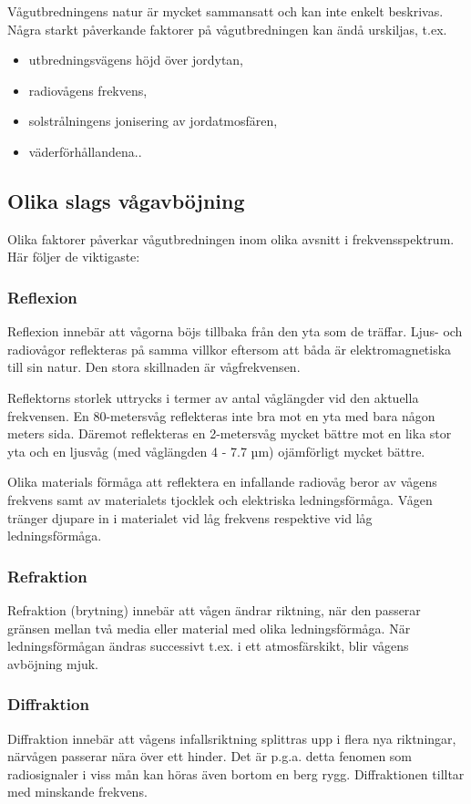 Vågutbredningens natur är mycket sammansatt och kan inte enkelt
beskrivas. Några starkt påverkande faktorer på vågutbredningen kan
ändå urskiljas, t.ex.
\begin{itemize}
\item utbredningsvägens höjd över jordytan,
\item radiovågens frekvens,
\item solstrålningens jonisering av jordatmosfären,
\item väderförhållandena..
\end{itemize}

\subsection{Olika slags vågavböjning}

Olika faktorer påverkar vågutbredningen inom olika avsnitt i
frekvensspektrum. Här följer de viktigaste:

\subsubsection{Reflexion}

Reflexion innebär att vågorna böjs tillbaka från den yta som de
träffar. Ljus- och radiovågor reflekteras på samma villkor eftersom
att båda är elektromagnetiska till sin natur.  Den stora skillnaden är
vågfrekvensen.

Reflektorns storlek uttrycks i termer av antal våglängder vid den
aktuella frekvensen. En 80-metersvåg reflekteras inte bra mot en yta
med bara någon meters sida.  Däremot reflekteras en 2-metersvåg mycket
bättre mot en lika stor yta och en ljusvåg (med våglängden 4 - 7.7 µm)
ojämförligt mycket bättre.

Olika materials förmåga att reflektera en infallande radiovåg beror av
vågens frekvens samt av materialets tjocklek och elektriska
ledningsförmåga. Vågen tränger djupare in i materialet vid låg
frekvens respektive vid låg ledningsförmåga.

\subsubsection{Refraktion}

Refraktion (brytning) innebär att vågen ändrar riktning, när den
passerar gränsen mellan två media eller material med olika
ledningsförmåga. När ledningsförmågan ändras successivt t.ex. i ett
atmosfärskikt, blir vågens avböjning mjuk.

\subsubsection{Diffraktion}

Diffraktion innebär att vågens infallsriktning splittras upp i flera
nya riktningar, närvågen passerar nära över ett hinder. Det är p.g.a.
detta fenomen som radiosignaler i viss mån kan höras även bortom en
berg rygg. Diffraktionen tilltar med minskande frekvens.
